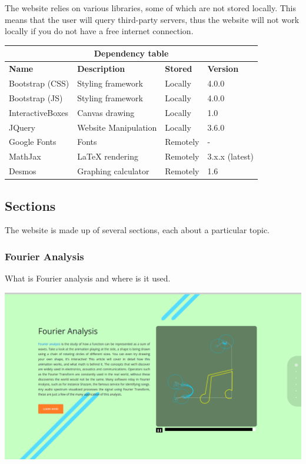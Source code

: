 \documentclass{article}
\begin{document}
The website relies on various libraries, some of which are not stored locally.
This means that the user will query third-party servers, thus the website will not work
locally if you do not have a free internet connection.

\medskip

\bgroup{}
\def\arraystretch{1.5}
\begin{center}
    \begin{tabular}{ |p{3cm}|p{4cm}|p{2cm}|p{2cm}| }
        \hline
        \multicolumn{4}{|c|}{\textbf{Dependency table}} \\
        \hline
        \textbf{Name} & \textbf{Description} & \textbf{Stored} & \textbf{Version} \\
        \hline
        Bootstrap (CSS) & Styling framework & Locally & 4.0.0 \\
        \hline
        Bootstrap (JS) & Styling framework & Locally & 4.0.0 \\
        \hline
        InteractiveBoxes & Canvas drawing & Locally & 1.0 \\
        \hline
        JQuery & Website Manipulation & Locally & 3.6.0 \\
        \hline
        Google Fonts & Fonts & Remotely & - \\
        \hline
        MathJax & LaTeX rendering & Remotely & 3.x.x (latest) \\
        \hline
        Desmos & Graphing calculator & Remotely & 1.6 \\
        \hline
    \end{tabular}
\end{center}
\egroup{}

\pagebreak

\subsection{Sections}

The website is made up of several sections, each about a particular topic.

\subsubsection{Fourier Analysis}

What is Fourier analysis and where is it used.

\includegraphics[width=\textwidth]{chap1.png}
\end{document}
